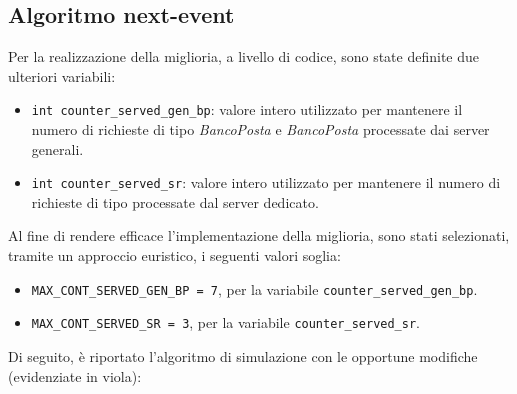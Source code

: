 \subsection{Algoritmo next-event}
Per la realizzazione della miglioria, a livello di codice, sono state definite due ulteriori variabili:
\begin{itemize}
\item \texttt{{\color{code_purple}int} counter\_served\_gen\_bp}: valore intero utilizzato per mantenere il numero di richieste di tipo \uo{} \textsl{BancoPosta} e \pp{} \textsl{BancoPosta} processate dai server generali.
\item \texttt{{\color{code_purple}int} counter\_served\_sr}: valore intero utilizzato per mantenere il numero di richieste di tipo \sr{} processate dal server dedicato.
\end{itemize}
Al fine di rendere efficace l'implementazione della miglioria, sono stati selezionati, tramite un approccio euristico, i seguenti valori soglia:
\begin{itemize}
\item \texttt{MAX\_CONT\_SERVED\_GEN\_BP = 7}, per la variabile \texttt{counter\_served\_gen\_bp}.
\item \texttt{MAX\_CONT\_SERVED\_SR = 3}, per la variabile \texttt{counter\_served\_sr}.
\end{itemize}
Di seguito, è riportato l'algoritmo di simulazione con le opportune modifiche (evidenziate in {\color{purple}viola}):
